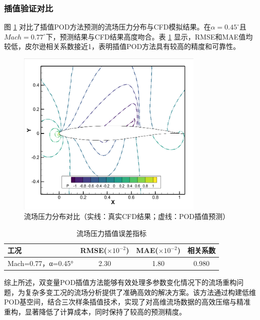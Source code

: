 \subsubsection{插值验证对比}

图 \ref{fig:double_flow_validation} 对比了插值POD方法预测的流场压力分布与CFD模拟结果。在$\alpha=0.45^\circ$且$Mach=0.77^\circ$下，预测结果与CFD结果高度吻合。表 \ref{tab:double_flow_error} 显示，RMSE和MAE值均较低，皮尔逊相关系数接近1，表明插值POD方法具有较高的精度和可靠性。

\begin{figure}[H]
    \centering
    \includegraphics[width=0.8\textwidth]{0.45_0.77对比图.png}
    \caption{流场压力分布对比（实线：真实CFD结果；虚线：POD插值预测）}
    \label{fig:double_flow_validation}
\end{figure}

\begin{table}[H]
    \centering
    \caption{流场压力插值误差指标}
    \label{tab:double_flow_error}
    \begin{tabular}{lccc}
        \toprule
        工况 & RMSE($\times10^{-2}$) & MAE($\times10^{-2}$) & 相关系数 \\
        \midrule
        Mach=0.77，α=0.45° & 2.30 & 1.80 & 0.980 \\
        \bottomrule
    \end{tabular}
\end{table}


综上所述，双变量POD插值方法能够有效处理多参数变化情况下的流场重构问题，为复杂多变工况的流场分析提供了准确高效的解决方案。该方法通过构建低维POD基空间，结合三次样条插值技术，实现了对高维流场数据的高效压缩与精准重构，显著降低了计算成本，同时保持了较高的预测精度。

